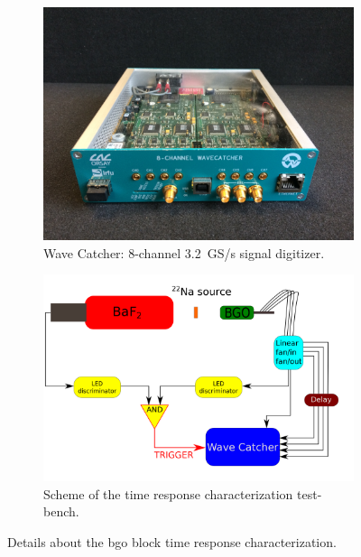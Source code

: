 \begin{figure}
\begin{subfigure}[t]{.45\textwidth}
\centering
\includegraphics[width=1\textwidth]{03_GraphicFiles/chapter3_CLaRySproto/Electronics_Acquisition/WaveCatcher.jpg}
\caption{Wave Catcher: 8-channel 3.2~GS/s signal digitizer.}
\label{chap3::fig::WaveCatcher}
\end{subfigure}
\begin{subfigure}[t]{.55\textwidth}
\centering
\includegraphics[width=1\textwidth]{03_GraphicFiles/chapter3_CLaRySproto/Absorber/images/timing_meas_scheme.png}
\caption{Scheme of the time response characterization test-bench.}
\label{chap3::fig::BGOtime_meas_scheme}
\end{subfigure}
\caption{Details about the \gls{bgo} block time response characterization.}
\label{chap3::fig::BGO_timingDaq}
\end{figure}

